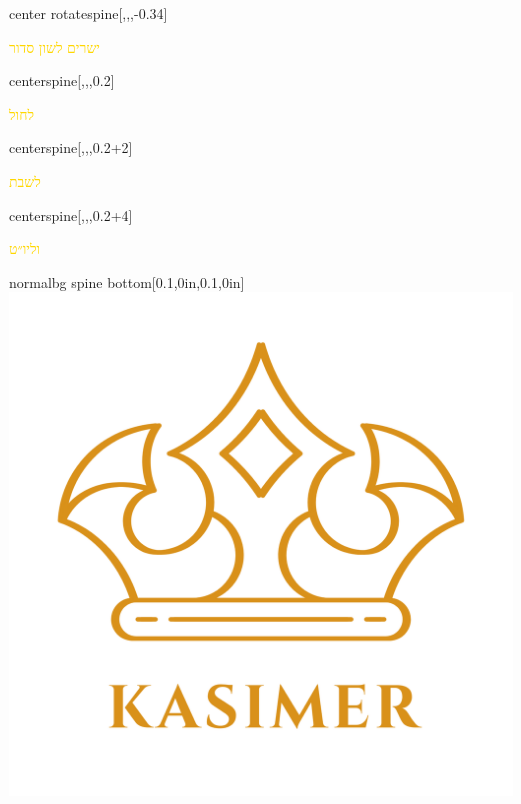 \documentclass[
coverheight=8.5in,
coverwidth=5.5in,
spinewidth=.781in,
bleedwidth=.125in,
marklength=0in,
12pt,
pagecolor=black,
]{bookcover}
\newcommand{\hebtext}[1]{
\begin{hebrew}
	#1
\end{hebrew}
}
\begin{document}
	\begin{bookcover}
	\begin{bookcoverelement}{center rotate}{spine}[,,,-0.34\coverheight]
		\LARGE\textcolor{gold}{\hebtext{ישרים לשון סדור} }
	\end{bookcoverelement}
	\begin{bookcoverelement}{center}{spine}[,,,0.2\coverheight]
	\textcolor{gold}{\hebtext{לחול}}
	\end{bookcoverelement}
	\begin{bookcoverelement}{center}{spine}[,,,0.2\coverheight+2\baselineskip]
	\textcolor{gold}{\hebtext{לשבת}}
	\end{bookcoverelement}
	\begin{bookcoverelement}{center}{spine}[,,,0.2\coverheight+4\baselineskip]
	\textcolor{gold}{\hebtext{וליו״ט}}
	\end{bookcoverelement}
	\begin{bookcoverelement}{normal}{bg spine bottom}[0.1\spinewidth,0in,0.1\spinewidth,0in]
		\includegraphics[width=0.8\spinewidth,height=0.8\spinewidth]{kasimer_logo.png}
	\end{bookcoverelement}
		

\end{bookcover}
\end{document}

